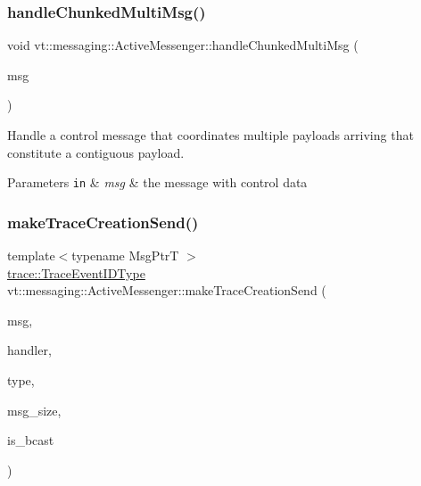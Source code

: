 \subsubsection{\texorpdfstring{handle\+Chunked\+Multi\+Msg()}{handleChunkedMultiMsg()}}
{\footnotesize\ttfamily void vt\+::messaging\+::\+Active\+Messenger\+::handle\+Chunked\+Multi\+Msg (\begin{DoxyParamCaption}\item[{\hyperlink{structvt_1_1messaging_1_1_multi_msg}{Multi\+Msg} $\ast$}]{msg }\end{DoxyParamCaption})\hspace{0.3cm}{\ttfamily [private]}}



Handle a control message that coordinates multiple payloads arriving that constitute a contiguous payload. 


\begin{DoxyParams}[1]{Parameters}
\mbox{\tt in}  & {\em msg} & the message with control data \\
\hline
\end{DoxyParams}
\mbox{\label{structvt_1_1messaging_1_1_active_messenger_a527858e860bb7b373489ae425fd3fdcc}} 
\subsubsection{\texorpdfstring{make\+Trace\+Creation\+Send()}{makeTraceCreationSend()}}
{\footnotesize\ttfamily template$<$typename Msg\+PtrT $>$ \\
\hyperlink{namespacevt_1_1trace_a64a7185f3e102df8d8258f263ccd1582}{trace\+::\+Trace\+Event\+I\+D\+Type} vt\+::messaging\+::\+Active\+Messenger\+::make\+Trace\+Creation\+Send (\begin{DoxyParamCaption}\item[{Msg\+PtrT}]{msg,  }\item[{\hyperlink{namespacevt_af64846b57dfcaf104da3ef6967917573}{Handler\+Type} const}]{handler,  }\item[{\hyperlink{namespacevt_1_1auto__registry_a9f369ca2b484130b396729e2ddf05241}{auto\+\_\+registry\+::\+Registry\+Type\+Enum}}]{type,  }\item[{\hyperlink{namespacevt_a408e86a8c7c89309b52907dc5a513924}{Msg\+Size\+Type}}]{msg\+\_\+size,  }\item[{bool}]{is\+\_\+bcast }\end{DoxyParamCaption})}

